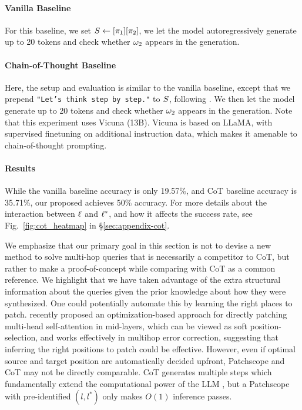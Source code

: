 \documentclass{article}
\theoremstyle{plain}
\theoremstyle{definition}
\theoremstyle{remark}
\begin{document}
\paragraph{Vanilla Baseline} For this baseline, we set $S \leftarrow [\pi_1][\pi_2]$, we let the model autoregressively generate up to 20 tokens and check whether $\omega_2$ appears in the generation.

\paragraph{Chain-of-Thought Baseline} Here, the setup and evaluation is similar to the vanilla baseline, except that we prepend \texttt{"Let's think step by step."} to $S$, following \citep{wei2022chain}. We then let the model generate up to 20 tokens and check whether $\omega_2$ appears in the generation. Note that this experiment uses Vicuna (13B). Vicuna is based on LLaMA, with supervised finetuning on additional instruction data, which makes it amenable to chain-of-thought prompting.

\paragraph{Results} 
While the vanilla baseline accuracy is only 19.57\%, and CoT baseline accuracy is 35.71\%, our proposed \methodName{} achieves 50\% accuracy. 
For more details about the interaction between $\ell$ and $\ell^*$, and how it affects the success rate, see Fig.~\ref{fig:cot_heatmap} in \S\ref{sec:appendix-cot}.

We emphasize that our primary goal in this section is not to devise a new method to solve multi-hop queries that is necessarily a competitor to CoT, but rather to make a proof-of-concept while comparing with CoT as a common reference. We highlight that we have taken advantage of the extra structural information about the queries given the prior knowledge about how they were synthesized. One could potentially automate this by learning the right places to patch. \citet{li2024understanding} recently proposed an optimization-based approach for directly patching multi-head self-attention in mid-layers, which can be viewed as soft position-selection, and works effectively in multihop error correction, suggesting that inferring the right positions to patch could be effective.
However, even if optimal source and target position are automatically decided upfront, Patchscope and CoT may not be directly comparable. CoT generates multiple steps which fundamentally extend the computational power of the LLM \cite{merrill2024expressive}, but a Patchscope with pre-identified $(l, l^*)$ only makes $O(1)$ inference passes.
\end{document}
